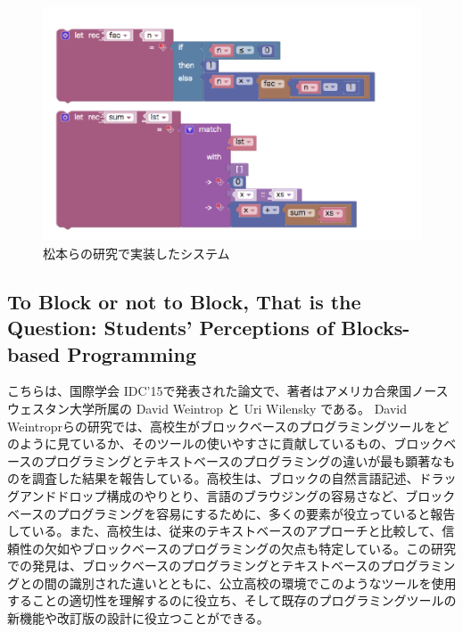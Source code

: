 \documentclass{risepaper}
\begin{document}
\begin{figure}[h]
\begin{center}
\includegraphics[scale=0.8]{img/otya.PNG}
\caption{松本らの研究で実装したシステム}%
\label{fig:otya}
\end{center}%
\end{figure}%

	\subsection{To Block or not to Block, That is the Question: Students’ Perceptions of Blocks-based Programming}
    
こちらは、国際学会 IDC'15で発表された論文\cite{idc}で、著者はアメリカ合衆国ノースウェスタン大学所属の David Weintrop と Uri Wilensky である。
David Weintroprらの研究では、高校生がブロックベースのプログラミングツールをどのように見ているか、そのツールの使いやすさに貢献しているもの、ブロックベースのプログラミングとテキストベースのプログラミングの違いが最も顕著なものを調査した結果を報告している。高校生は、ブロックの自然言語記述、ドラッグアンドドロップ構成のやりとり、言語のブラウジングの容易さなど、ブロックベースのプログラミングを容易にするために、多くの要素が役立っていると報告している。また、高校生は、従来のテキストベースのアプローチと比較して、信頼性の欠如やブロックベースのプログラミングの欠点も特定している。この研究での発見は、ブロックベースのプログラミングとテキストベースのプログラミングとの間の識別された違いとともに、公立高校の環境でこのようなツールを使用することの適切性を理解するのに役立ち、そして既存のプログラミングツールの新機能や改訂版の設計に役立つことができる。
\end{document}

